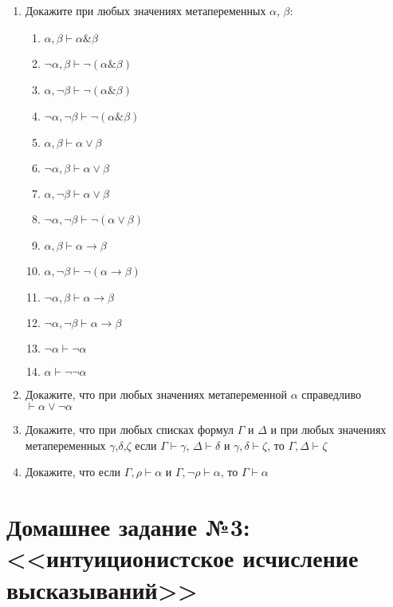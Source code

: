 \documentclass[10pt,a4paper,oneside]{article}
\begin{document}
\begin{enumerate}
\item Докажите при любых значениях метапеременных $\alpha$, $\beta$:
\begin{enumerate}
\item $\alpha,\beta \vdash \alpha\&\beta$
\item $\neg\alpha,\beta \vdash \neg(\alpha\&\beta)$
\item $\alpha,\neg\beta \vdash \neg(\alpha\&\beta)$
\item $\neg\alpha,\neg\beta \vdash \neg(\alpha\&\beta)$
\item $\alpha,\beta \vdash \alpha\vee\beta$
\item $\neg\alpha,\beta \vdash \alpha\vee\beta$
\item $\alpha,\neg\beta \vdash \alpha\vee\beta$
\item $\neg\alpha,\neg\beta \vdash \neg(\alpha\vee\beta)$
\item $\alpha,\beta \vdash \alpha\rightarrow\beta$
\item $\alpha,\neg\beta \vdash \neg(\alpha\rightarrow\beta)$
\item $\neg\alpha,\beta \vdash \alpha\rightarrow\beta$
\item $\neg\alpha,\neg\beta \vdash \alpha\rightarrow\beta$
\item $\neg\alpha \vdash \neg\alpha$
\item $\alpha \vdash \neg\neg\alpha$
\end{enumerate}

\item Докажите, что при любых значениях метапеременной $\alpha$ 
справедливо $\vdash \alpha\vee\neg\alpha$

\item Докажите, что при любых списках формул $\Gamma$ и $\Delta$ и при любых
значениях метапеременных $\gamma$,$\delta$,$\zeta$
если $\Gamma \vdash \gamma$, $\Delta \vdash \delta$ и $\gamma,\delta\vdash\zeta$,
то $\Gamma,\Delta\vdash\zeta$

\item Докажите, что если $\Gamma, \rho \vdash \alpha$ и $\Gamma, \neg\rho \vdash \alpha$,
то $\Gamma \vdash \alpha$
\end{enumerate}

\section*{Домашнее задание №3: <<интуиционистское исчисление высказываний>>}
\end{document}
